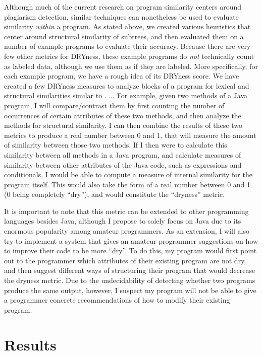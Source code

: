 \documentclass{article}
\begin{document}
Although much of the current research on program similarity centers around plagiarism detection, similar techniques can nonetheless
 be used to evaluate similarity \textit{within} a program. As stated above, we created various heuristics that center around
structural similarity of subtrees, and then evaluated them on a number of example programs to evaluate their accuracy. Because there
are very few other metrics for DRYness, these example programs do \textit{not} technically count as labeled data, although we use
them as if they are labeled. More specifically, for each example program, we have a rough idea of its DRYness score.
We have created a few DRYness measures to analyze blocks of a program for lexical and structural similarities similar to \cite{ProgramSimilarityPopulations}. ... For example, given two methods of a Java program, I will compare/contrast them by first counting the number of occurrences of certain attributes of these two methods, and then analyze the methods for structural similarity. I can then combine the results of these two metrics to produce a real number between 0 and 1, that will measure the amount of similarity between those two methods. If I then were to calculate this similarity between all methods in a Java program, and calculate measures of similarity between other attributes of the Java code, such as expressions and conditionals, I would be able to compute a measure of internal similarity for the program itself. This would also take the form of a real number between 0 and 1 (0 being completely ``dry''), and would constitute the ``dryness'' metric.

It is important to note that this metric can be extended to other programming languages besides Java, although I propose to solely focus on Java due to its enormous popularity among amateur programmers. As an extension, I will also try to implement a system that gives an amateur programmer suggestions on how to improve their code to be more ``dry''. To do this, my program would first point out to the programmer which attributes of their existing program are not dry, and then suggest different ways of structuring their program that would decrease the dryness metric. Due to the undecidability of detecting whether two programs produce the same output, however, I suspect my program will not be able to give a programmer concrete recommendations of how to modify their existing program.

\section{Results}
\end{document}
